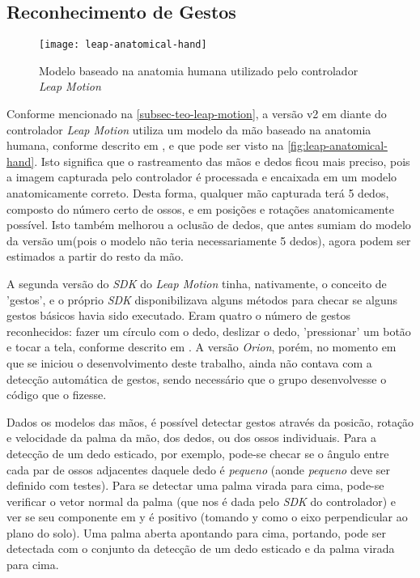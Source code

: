 \subsection{Reconhecimento de Gestos}\label{subsubsec-teo-gestos}

\begin{figure}[h]
	\centering
	\caption{Modelo baseado na anatomia humana utilizado pelo controlador \textit{Leap Motion}}
	\texttt{[image: leap-anatomical-hand]}
	\label{fig:leap-anatomical-hand}
\end{figure}

Conforme mencionado na \autoref{subsec-teo-leap-motion}, a versão 
v2 em diante do controlador \textit{Leap Motion} utiliza um modelo 
da mão baseado na anatomia humana, conforme descrito 
em \cite{leap:2016:intro-skeletal}, e que pode ser visto 
na \autoref{fig:leap-anatomical-hand}. Isto significa que o 
rastreamento das mãos e dedos ficou mais preciso, pois a 
imagem capturada pelo controlador é processada e encaixada em 
um modelo anatomicamente correto. Desta forma, qualquer mão 
capturada terá 5 dedos, composto do número certo de ossos, e 
em posições e rotações anatomicamente possível. Isto também 
melhorou a oclusão de dedos, que antes sumiam do modelo da 
versão um(pois o modelo não teria necessariamente 5 dedos), 
agora podem ser estimados a partir do resto da mão.

A segunda versão do \textit{SDK} do \textit{Leap Motion} 
tinha, nativamente, o conceito de 'gestos', e o próprio 
\textit{SDK} disponibilizava alguns métodos para checar 
se alguns gestos básicos havia sido executado. Eram quatro 
o número de gestos reconhecidos: fazer um círculo com o 
dedo, deslizar o dedo, 'pressionar' um botão e tocar a 
tela, conforme descrito em \cite{leap:2016:gestures}. A 
versão \textit{Orion}, porém, no momento em que se 
iniciou o desenvolvimento deste trabalho, ainda não 
contava com a detecção automática de gestos, sendo 
necessário que o grupo desenvolvesse o código que o fizesse.

Dados os modelos das mãos, é possível detectar gestos através 
da posicão, rotação e velocidade da palma da mão, dos dedos, 
ou dos ossos individuais. Para a detecção de um dedo 
esticado, por exemplo, pode-se checar se o ângulo entre 
cada par de ossos adjacentes daquele dedo é \textit{pequeno} 
(aonde \textit{pequeno} deve ser definido com testes). 
Para se detectar uma palma virada para cima, pode-se 
verificar o vetor normal da palma (que nos é dada pelo 
\textit{SDK} do controlador) e ver se seu componente em 
y é positivo (tomando y como o eixo perpendicular ao 
plano do solo). Uma palma aberta apontando para cima, 
portando, pode ser detectada com o conjunto da detecção 
de um dedo esticado e da palma virada para cima.

